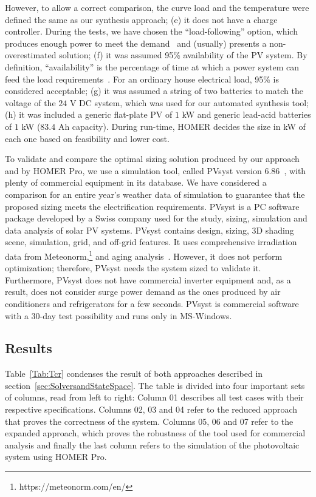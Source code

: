 \documentclass[10pt,journal,compsoc]{IEEEtran}
\begin{document}
However, to allow a correct comparison, the curve load and the temperature were defined the same as our synthesis approach; 
(e) it does not have a charge controller. During the tests, we have chosen the ``load-following'' option, which produces enough power to meet the demand~\cite{HOMER} and (usually) presents a non-overestimated solution; 
(f) it was assumed 95\% availability of the PV system. By definition, ``availability'' is the percentage of time at which a power system can feed the load requirements~\cite{Khatib2014}. For an ordinary house electrical load, 95\% is considered acceptable;
(g) it was assumed a string of two batteries to match the voltage of the $24$ V DC system, which was used for our automated synthesis tool; 
(h) it was included a generic flat-plate PV of $1$ kW and generic lead-acid batteries of $1$ kW ($83.4$ Ah capacity). During run-time, HOMER decides the size in kW of each one based on feasibility and lower cost.

To validate and compare the optimal sizing solution produced by our approach and by HOMER Pro, we use a simulation tool, called PVsyst version $6.86$~\cite{PVsyst}, with plenty of commercial equipment in its database. We have considered a comparison for an entire year's weather data of simulation to guarantee that the proposed sizing meets the electrification requirements. PVsyst is a PC software package developed by a Swiss company used for the study, sizing, simulation and data analysis of solar PV systems. PVsyst contains design, sizing, 3D shading scene, simulation, grid, and off-grid features. It uses comprehensive irradiation data from Meteonorm,\footnote{https://meteonorm.com/en/} and aging analysis~\cite{PVsyst2017}. However, it does not perform optimization; therefore, PVsyst needs the system sized to validate it. Furthermore, PVsyst does not have commercial inverter equipment and, as a result, does not consider surge power demand as the ones produced by air conditioners and refrigerators for a few seconds. PVsyst is commercial software with a $30$-day test possibility and runs only in MS-Windows.

\subsection{Results}

 Table~\ref{Tab:Tcr} condenses the result of both approaches described in section~\ref{sec:SolversandStateSpace}. The table is divided into four important sets of columns, read from left to right: Column 01 describes all test cases with their respective specifications. Columns 02, 03 and 04 refer to the reduced approach that proves the correctness of the system. Columns 05, 06 and 07 refer to the expanded approach, which proves the robustness of the tool used for commercial analysis and finally the last column refers to the simulation of the photovoltaic system using HOMER Pro.
\end{document}

